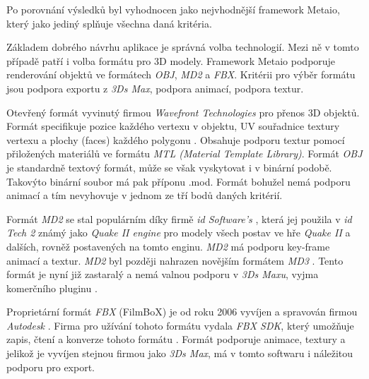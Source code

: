 \documentclass[twoside,12pt]{article}
\begin{document}
Po porovnání výsledků byl vyhodnocen jako nejvhodnější framework Metaio, který jako jediný splňuje všechna daná kritéria.

Základem dobrého návrhu aplikace je správná volba technologií. Mezi ně v tomto případě patří i volba formátu pro 3D modely. Framework Metaio podporuje renderování objektů ve formátech \textit{OBJ}, \textit{MD2} a \textit{FBX}. 
Kritérii pro výběr formátu jsou podpora exportu z \textit{3Ds Max}, podpora animací, podpora textur.

Otevřený formát vyvinutý firmou \textit{Wavefront Technologies} pro přenos 3D objektů. Formát specifikuje pozice každého vertexu v objektu, UV souřadnice textury vertexu a plochy (faces) každého polygonu \cite{obj_wiki}. Obsahuje podporu textur pomocí přiložených materiálů ve formátu \textit{MTL (Material Template Library)}. Formát \textit{OBJ} je standardně textový formát, může se však vyskytovat i v binární podobě. Takovýto binární soubor má pak příponu .mod. Formát bohužel nemá podporu animací \cite{obj_doc} a tím nevyhovuje v jednom ze tří bodů daných kritérií.

Formát \textit{MD2} se stal populárním díky firmě \textit{id Software's} \cite{md2_wiki}, která jej použila v \textit{id Tech 2} známý jako \textit{Quake II engine} \cite{quake_engine} pro modely všech postav ve hře \textit{Quake II} a dalších, rovněž postavených na tomto enginu. \textit{MD2} má podporu key-frame animací a textur. \textit{MD2} byl později nahrazen novějším formátem \textit{MD3} \cite{id_tech_3_wiki}. Tento formát je nyní již zastaralý a nemá valnou podporu v \textit{3Ds Maxu}, vyjma komerčního pluginu \cite{qtip_plugin}. 

Proprietární formát \textit{FBX} (FilmBoX) je od roku 2006 vyvíjen a spravován firmou \textit{Autodesk} \cite{autodesk_fbx}. Firma pro užívání tohoto formátu vydala \textit{FBX SDK}, který umožňuje zapis, čtení a konverze tohoto formátu \cite{autodesk_fbx_sdk}. Formát podporuje animace, textury a jelikož je vyvíjen stejnou firmou jako \textit{3Ds Max}, má v tomto softwaru i náležitou podporu pro export.

\end{document}
